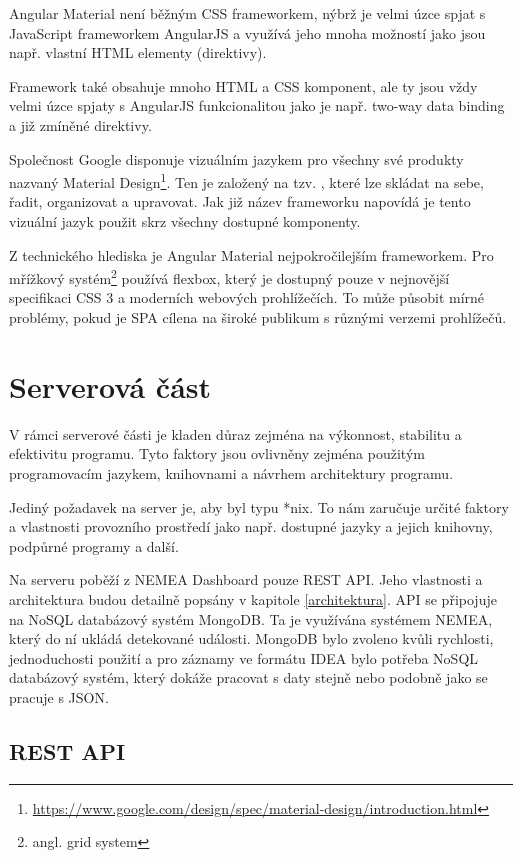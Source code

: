 Angular Material není běžným CSS frameworkem, nýbrž je velmi úzce spjat s JavaScript frameworkem AngularJS a využívá jeho mnoha možností jako jsou např. vlastní HTML elementy (direktivy).

Framework také obsahuje mnoho HTML a CSS komponent, ale ty jsou vždy velmi úzce spjaty s AngularJS funkcionalitou jako je např. two-way data binding a již zmíněné direktivy. 

Společnost Google disponuje vizuálním jazykem pro všechny své produkty nazvaný Material Design\footnote{\url{https://www.google.com/design/spec/material-design/introduction.html}}. Ten je založený na tzv. , které lze skládat na sebe, řadit, organizovat a upravovat. Jak již název frameworku napovídá je tento vizuální jazyk použit skrz všechny dostupné komponenty.

Z technického hlediska je Angular Material nejpokročilejším frameworkem. Pro mřížkový systém\footnote{angl. grid system} používá flexbox\cite{flexbox}, který je dostupný pouze v nejnovější specifikaci CSS 3 a moderních webových prohlížečích. To může působit mírné problémy, pokud je SPA cílena na široké publikum s různými verzemi prohlížečů.


\section{Serverová část}

V rámci serverové části je kladen důraz zejména na výkonnost, stabilitu a efektivitu programu. Tyto faktory jsou ovlivněny zejména použitým programovacím jazykem, knihovnami a návrhem architektury programu.

Jediný požadavek na server je, aby byl typu *nix. To nám zaručuje určité faktory a vlastnosti provozního prostředí jako např. dostupné jazyky a jejich knihovny, podpůrné programy a další.

Na serveru poběží z NEMEA Dashboard pouze REST API\cite{rest}. Jeho vlastnosti a architektura budou detailně popsány v kapitole \ref{architektura}. API se připojuje na NoSQL databázový systém MongoDB. Ta je využívána systémem NEMEA, který do ní ukládá detekované události. MongoDB bylo zvoleno kvůli rychlosti, jednoduchosti použití a pro záznamy ve formátu IDEA bylo potřeba NoSQL databázový systém, který dokáže pracovat s daty stejně nebo podobně jako se pracuje s JSON.

\subsection{REST API}
\label{crud}


